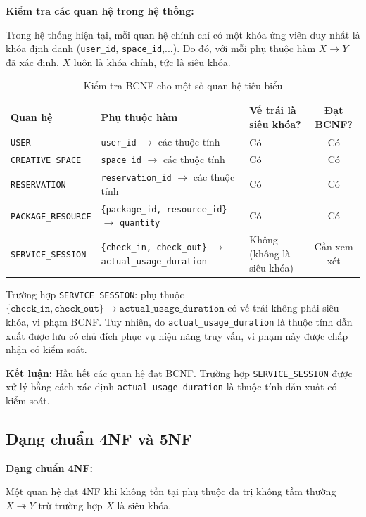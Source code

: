 \textbf{Kiểm tra các quan hệ trong hệ thống:}

Trong hệ thống hiện tại, mỗi quan hệ chính chỉ có một khóa ứng viên duy nhất là khóa định danh (\texttt{user\_id}, \texttt{space\_id},...). Do đó, với mỗi phụ thuộc hàm $X \rightarrow Y$ đã xác định, $X$ luôn là khóa chính, tức là siêu khóa.

\begin{table}[htbp]
\centering
\begin{tabularx}{\linewidth}{|l|X|p{3.2cm}|c|}
\hline
\textbf{Quan hệ} & \textbf{Phụ thuộc hàm} & \textbf{Vế trái là siêu khóa?} & \textbf{Đạt BCNF?} \\
\hline
\texttt{USER} & \texttt{user\_id} $\rightarrow$ các thuộc tính & Có & Có \\
\hline
\texttt{CREATIVE\_SPACE} & \texttt{space\_id} $\rightarrow$ các thuộc tính & Có & Có \\
\hline
\texttt{RESERVATION} & \texttt{reservation\_id} $\rightarrow$ các thuộc tính & Có & Có \\
\hline
\texttt{PACKAGE\_RESOURCE} & \texttt{\{package\_id, resource\_id\}} $\rightarrow$ \texttt{quantity} & Có & Có \\
\hline
\texttt{SERVICE\_SESSION} & \texttt{\{check\_in, check\_out\}} $\rightarrow$ \texttt{actual\_usage\_duration} & Không (không là siêu khóa) & Cần xem xét \\
\hline
\end{tabularx}
\caption{Kiểm tra BCNF cho một số quan hệ tiêu biểu}
\end{table}

Trường hợp \texttt{SERVICE\_SESSION}: phụ thuộc $\{\texttt{check\_in}, \texttt{check\_out}\} \rightarrow \texttt{actual\_usage\_duration}$ có vế trái không phải siêu khóa, vi phạm BCNF. Tuy nhiên, do \texttt{actual\_usage\_duration} là thuộc tính dẫn xuất được lưu có chủ đích phục vụ hiệu năng truy vấn, vi phạm này được chấp nhận có kiểm soát.

\textbf{Kết luận:} Hầu hết các quan hệ đạt BCNF. Trường hợp \texttt{SERVICE\_SESSION} được xử lý bằng cách xác định \texttt{actual\_usage\_duration} là thuộc tính dẫn xuất có kiểm soát.

\subsection{Dạng chuẩn 4NF và 5NF}

\textbf{Dạng chuẩn 4NF:}

Một quan hệ đạt 4NF khi không tồn tại phụ thuộc đa trị không tầm thường $X \twoheadrightarrow Y$ trừ trường hợp $X$ là siêu khóa.

